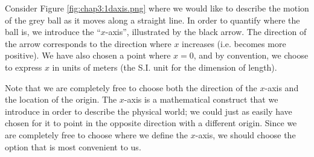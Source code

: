 Consider Figure \ref{fig:chap3:1daxis.png} where we would like to describe the motion of the grey ball as it moves along a straight line. In order to quantify where the ball is, we introduce the ``$x$-axis'', illustrated by the black arrow. The direction of the arrow corresponds to the direction where $x$ increases (i.e. becomes more positive). We have also chosen a point where $x=0$, and by convention, we choose to express $x$ in units of meters (the S.I. unit for the dimension of length).

Note that we are completely free to choose both the direction of the $x$-axis and the location of the origin. The $x$-axis is a mathematical construct that we introduce in order to describe the physical world; we could just as easily have chosen for it to point in the opposite direction with a different origin. Since we are completely free to choose where we define the $x$-axis, we should choose the option that is most convenient to us. 

